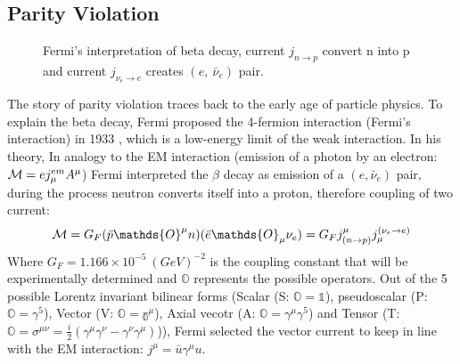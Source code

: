 \subsection{Parity Violation}
\begin{figure}[H]
    \centering
    \caption{Fermi's interpretation of beta decay, current $j_{n \rightarrow p}$ 
    convert n into p and current $j_{\nu_e \rightarrow e}$ creates $(e, \ \bar{\nu}_e) $
    pair.}
\end{figure}
The story of parity violation traces back to the early age of particle physics. To explain the beta decay, 
Fermi proposed the 4-fermion interaction 
(Fermi's interaction) in 1933 \cite{Fermi1934}, which is a low-energy limit of the 
weak interaction. In his theory, In analogy to the EM interaction (emission of a
photon by an electron: $\mathcal{M} = ej_\mu^{em} A^\mu$) Fermi interpreted the $\beta$
decay as emission of a $(e, \bar{\nu}_e)$ pair, during the process neutron converts
itself into a proton, therefore coupling of two current:
\begin{equation}
    \CM = G_F (\bar{p} \mathds{O}^\mu n)(\bar{e} \mathds{O}_\mu \nu_e) 
	= G_F j^\mu_{(n\rightarrow p)} j_\mu^{(\nu_e\rightarrow e)}
\end{equation}
Where $G_F = 1.166 \times 10^{-5} \ (GeV)^{-2}$ is the coupling constant that 
will be experimentally determined and $\mathds{O}$ represents 
the possible operators. Out of the 5 possible Lorentz invariant bilinear forms 
(Scalar (S: $\mathds{O} = \mathds{1}$), pseudoscalar (P: $\mathds{O} = \gamma^5$), 
Vector (V: $\mathds{O} = \mathds{\gamma^\mu}$), Axial vecotr (A: $\mathds{O} = \gamma^\mu\gamma^5$) 
and Tensor (T: $\mathds{O}=\sigma^{\mu\nu} = \frac{i}{2}(\gamma^\mu\gamma^\nu - \gamma^\nu\gamma^\mu)$)),
Fermi selected the vector current to keep in line with the EM interaction:
$j^\mu = \bar{u} \gamma^\mu u$.

